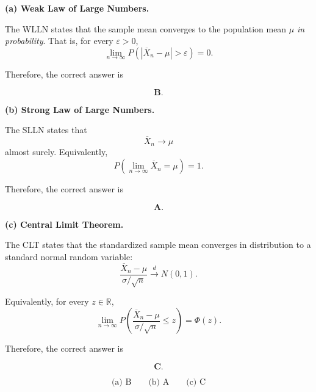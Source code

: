\documentclass[11pt]{article}
\begin{document}
\begin{solutionbox}

\textbf{(a) Weak Law of Large Numbers.}

The WLLN states that the sample mean converges to the population mean
\(\mu\) \emph{in probability}. That is, for every \(\varepsilon>0\),
\[
\lim_{n\to\infty}
P\left(
|\overline X_n-\mu|>\varepsilon
\right)
=
0.
\]

Therefore, the correct answer is

\[
\textbf{B}.
\]


\textbf{(b) Strong Law of Large Numbers.}

The SLLN states that
\[
\overline X_n\longrightarrow\mu
\]
almost surely. Equivalently,
\[
P\left(
\lim_{n\to\infty}\overline X_n=\mu
\right)
=
1.
\]

Therefore, the correct answer is

\[
\textbf{A}.
\]


\textbf{(c) Central Limit Theorem.}

The CLT states that the standardized sample mean converges in distribution
to a standard normal random variable:
\[
\frac{\overline X_n-\mu}{\sigma/\sqrt n}
\xrightarrow[]{d}
N(0,1).
\]

Equivalently, for every \(z\in\mathbb R\),
\[
\lim_{n\to\infty}
P\left(
\frac{\overline X_n-\mu}{\sigma/\sqrt n}
\leq z
\right)
=
\Phi(z).
\]

Therefore, the correct answer is

\[
\textbf{C}.
\]

\begin{finalanswerbox}

\[
\boxed{\text{(a) B}}
\qquad
\boxed{\text{(b) A}}
\qquad
\boxed{\text{(c) C}}
\]

\end{finalanswerbox}

\end{solutionbox}
\end{document}
